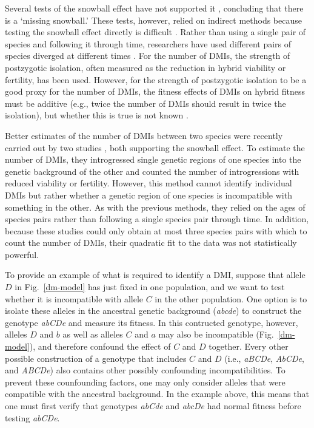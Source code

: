 \begin{doublespace}
Several tests of the snowball effect have not supported it
\citep{lij03,men04,gou10}, concluding that there is a `missing snowball.'
%
These tests, however, relied on indirect methods
because testing the snowball effect directly is difficult \citep{men04}.
%
Rather than using a single pair of species and following it through time,
researchers have used different pairs of species diverged at different times
\citep{mal08,sco08}.
%
For the number of DMIs, the strength of postzygotic isolation,
often measured as the reduction in hybrid viability or fertility, has been used.
%
However, for the strength of postzygotic isolation to be a good proxy
for the number of DMIs,
the fitness effects of DMIs on hybrid fitness must be additive
\citep{men04,bol05}
(e.g., twice the number of DMIs should result in twice the isolation),
but whether this is true is not known \citep{bol05,pre10}.




Better estimates of the number of DMIs between two species
were recently carried out by two studies \citep{mat10,moy10},
both supporting the snowball effect.
%
To estimate the number of DMIs, they introgressed single genetic regions
of one species into the genetic background of the other and
counted the number of introgressions with reduced viability or fertility.
%
However, this method cannot identify individual DMIs
but rather whether a genetic region of one species
is incompatible with something in the other.
%
As with the previous methods, they relied on the ages of species pairs
rather than following a single species pair through time.
%
In addition, because these studies could only obtain
at most three species pairs with which to count the number of DMIs,
their quadratic fit to the data was not statistically powerful.




To provide an example of what is required to identify a DMI,
suppose that allele $D$ in Fig.~\ref{dm-model} has just fixed
in one population, and we want to test whether it is incompatible
with allele $C$ in the other population.
%
One option is to isolate these alleles in the ancestral genetic background
(\emph{abcde}) to construct the genotype \emph{abCDe} and measure its fitness.
%
In this contructed genotype, however,
alleles $D$ and $b$ as well as alleles $C$ and $a$
may also be incompatible (Fig.~\ref{dm-model}),
and therefore confound the effect of $C$ and $D$ together.
%
Every other possible construction of a genotype that includes $C$ and $D$
(i.e., \emph{aBCDe}, \emph{AbCDe}, and \emph{ABCDe})
also contains other possibly confounding incompatibilities.
%
To prevent these counfounding factors, one may only consider
alleles that were compatible with the ancestral background.
%
In the example above, this means that one must first verify that genotypes
\emph{abCde} and \emph{abcDe} had normal fitness before testing \emph{abCDe}.



\end{doublespace}
